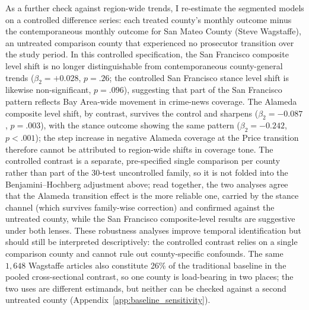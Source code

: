 \documentclass[12pt, letterpaper]{article}
\begin{document}
\begin{appendices}
As a further check against region-wide trends, I re-estimate the segmented models on a controlled difference series: each treated county's monthly outcome minus the contemporaneous monthly outcome for San Mateo County (Steve Wagstaffe), an untreated comparison county that experienced no prosecutor transition over the study period. In this controlled specification, the San Francisco composite level shift is no longer distinguishable from contemporaneous county-general trends ($\beta_2 = +0.028$, $p = .26$; the controlled San Francisco stance level shift is likewise non-significant, $p = .096$), suggesting that part of the San Francisco pattern reflects Bay Area-wide movement in crime-news coverage. The Alameda composite level shift, by contrast, survives the control and sharpens ($\beta_2 = -0.087$, $p = .003$), with the stance outcome showing the same pattern ($\beta_2 = -0.242$, $p < .001$); the step increase in negative Alameda coverage at the Price transition therefore cannot be attributed to region-wide shifts in coverage tone. The controlled contrast is a separate, pre-specified single comparison per county rather than part of the 30-test uncontrolled family, so it is not folded into the Benjamini--Hochberg adjustment above; read together, the two analyses agree that the Alameda transition effect is the more reliable one, carried by the stance channel (which survives family-wise correction) and confirmed against the untreated county, while the San Francisco composite-level results are suggestive under both lenses. These robustness analyses improve temporal identification but should still be interpreted descriptively: the controlled contrast relies on a single comparison county and cannot rule out county-specific confounds. The same $1{,}648$ Wagstaffe articles also constitute 26\% of the traditional baseline in the pooled cross-sectional contrast, so one county is load-bearing in two places; the two uses are different estimands, but neither can be checked against a second untreated county (Appendix~\ref{app:baseline_sensitivity}).

\end{appendices}
\end{document}
